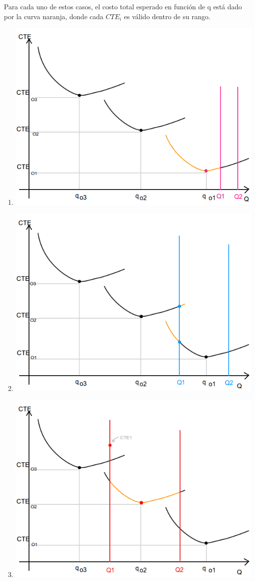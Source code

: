 \documentclass[a4paper,10pt]{article}
\begin{document}
Para cada uno de estos casos, el costo total esperado en función de q está dado por la curva naranja, donde cada $CTE_i$ es válido dentro de su rango. 
\begin{enumerate}
 \item \includegraphics[scale=0.4,keepaspectratio=true]{img/7/7_QvsCTE_1B.png} 
 \item \includegraphics[scale=0.4,keepaspectratio=true]{img/7/7_QvsCTE_2B.png} 
 \item \includegraphics[scale=0.4,keepaspectratio=true]{img/7/7_QvsCTE_3B.png} 

\end{enumerate}
\end{document}
